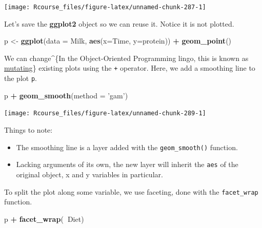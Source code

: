 \documentclass[]{book}
\newenvironment{Shaded}{\begin{snugshade}}{\end{snugshade}}
\newcommand{\KeywordTok}[1]{\textcolor[rgb]{0.13,0.29,0.53}{\textbf{#1}}}
\newcommand{\DataTypeTok}[1]{\textcolor[rgb]{0.13,0.29,0.53}{#1}}
\newcommand{\StringTok}[1]{\textcolor[rgb]{0.31,0.60,0.02}{#1}}
\newcommand{\OperatorTok}[1]{\textcolor[rgb]{0.81,0.36,0.00}{\textbf{#1}}}
\newcommand{\NormalTok}[1]{#1}
\providecommand{\tightlist}{%
  \setlength{\itemsep}{0pt}\setlength{\parskip}{0pt}}
\theoremstyle{definition}
\theoremstyle{definition}
\theoremstyle{definition}
\theoremstyle{remark}
\begin{document}
\texttt{[image: Rcourse\_files/figure-latex/unnamed-chunk-287-1]}

Let's save the \textbf{ggplot2} object so we can reuse it. Notice it is
not plotted.

\begin{Shaded}
\begin{Highlighting}[]
\NormalTok{p <-}\StringTok{ }\KeywordTok{ggplot}\NormalTok{(}\DataTypeTok{data =}\NormalTok{ Milk, }\KeywordTok{aes}\NormalTok{(}\DataTypeTok{x=}\NormalTok{Time, }\DataTypeTok{y=}\NormalTok{protein)) }\OperatorTok{+}
\StringTok{  }\KeywordTok{geom_point}\NormalTok{()}
\end{Highlighting}
\end{Shaded}

We can change\^{}\{In the Object-Oriented Programming lingo, this is
known as
\href{https://en.wikipedia.org/wiki/Immutable_object}{mutating}\}
existing plots using the \texttt{+} operator. Here, we add a smoothing
line to the plot \texttt{p}.

\begin{Shaded}
\begin{Highlighting}[]
\NormalTok{p }\OperatorTok{+}\StringTok{ }\KeywordTok{geom_smooth}\NormalTok{(}\DataTypeTok{method =} \StringTok{'gam'}\NormalTok{)}
\end{Highlighting}
\end{Shaded}

\texttt{[image: Rcourse\_files/figure-latex/unnamed-chunk-289-1]}

Things to note:

\begin{itemize}
\tightlist
\item
  The smoothing line is a layer added with the \texttt{geom\_smooth()}
  function.
\item
  Lacking arguments of its own, the new layer will inherit the
  \texttt{aes} of the original object, x and y variables in particular.
\end{itemize}

To split the plot along some variable, we use faceting, done with the
\texttt{facet\_wrap} function.

\begin{Shaded}
\begin{Highlighting}[]
\NormalTok{p }\OperatorTok{+}\StringTok{ }\KeywordTok{facet_wrap}\NormalTok{(}\OperatorTok{~}\NormalTok{Diet)}
\end{Highlighting}
\end{Shaded}
\end{document}
